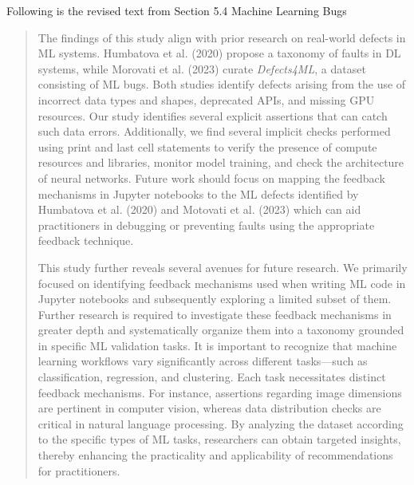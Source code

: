 \documentclass[11pt,fleqn]{article}
\begin{document}
Following is the revised text from Section 5.4 Machine Learning Bugs

\begin{quote}
  The findings of this study align with prior research on real-world defects in ML systems. Humbatova et al. (2020) propose a taxonomy of faults in DL systems, while Morovati et al. (2023) curate \emph{Defects4ML}, a dataset consisting of ML bugs. Both studies identify defects arising from the use of incorrect data types and shapes, deprecated APIs, and missing GPU resources. Our study identifies several explicit assertions that can catch such data errors. Additionally, we find several implicit checks performed using print and last cell statements to verify the presence of compute resources and libraries, monitor model training, and check the architecture of neural networks. Future work should focus on mapping the feedback mechanisms in Jupyter notebooks to the ML defects identified by Humbatova et al. (2020) and Motovati et al. (2023) which can aid practitioners in debugging or preventing faults using the appropriate feedback technique.

  This study further reveals several avenues for future research. We primarily focused on identifying feedback mechanisms used when writing ML code in Jupyter notebooks and subsequently exploring a limited subset of them. Further research is required to investigate these feedback mechanisms in greater depth and systematically organize them into a taxonomy grounded in specific ML validation tasks. It is important to recognize that machine learning workflows vary significantly across different tasks---such as classification, regression, and clustering. Each task necessitates distinct feedback mechanisms. For instance, assertions regarding image dimensions are pertinent in computer vision, whereas data distribution checks are critical in natural language processing. By analyzing the dataset according to the specific types of ML tasks, researchers can obtain targeted insights, thereby enhancing the practicality and applicability of recommendations for practitioners.

\end{quote}
\end{document}
